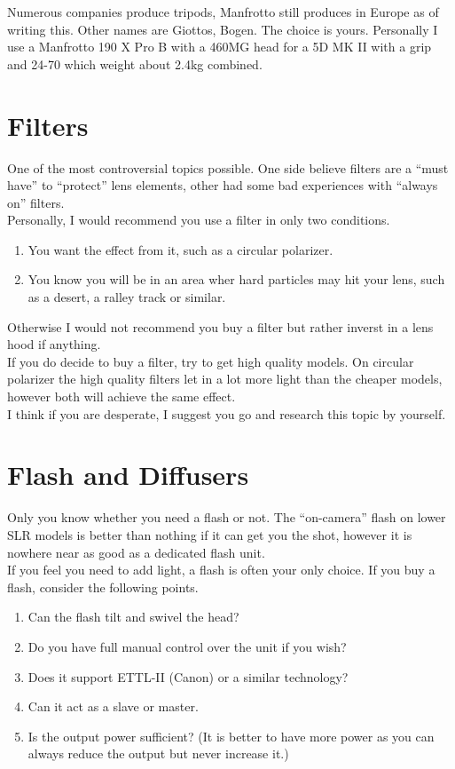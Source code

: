 Numerous companies produce tripods, Manfrotto still produces in Europe as of writing this.
Other names are Giottos, Bogen. The choice is yours. Personally I use a Manfrotto 190 X Pro B with a 460MG head for a 5D MK II with a grip and 24-70 which weight about 2.4kg combined.

\section{Filters}

One of the most controversial topics possible. One side believe filters are a ``must have'' to ``protect'' lens elements, other had some bad experiences with ``always on'' filters.
\\
Personally, I would recommend you use a filter in only two conditions.
\begin{enumerate}
	\item You want the effect from it, such as a circular polarizer.
	\item You know you will be in an area wher hard particles may hit your lens, such as a desert, a ralley track or similar.
\end{enumerate}

Otherwise I would not recommend you buy a filter but rather inverst in a lens hood if anything.
\\
If you do decide to buy a filter, try to get high quality models. On circular polarizer the high quality filters let in a lot more light than the cheaper models, however both will achieve the same effect.
\\
I think if you are desperate, I suggest you go and research this topic by yourself.


\section{Flash and Diffusers}

Only you know whether you need a flash or not. The ``on-camera'' flash on lower SLR models is better than nothing if it can get you the shot, however it is nowhere near as good as a dedicated flash unit.
\\
If you feel you need to add light, a flash is often your only choice. If you buy a flash, consider the following points.

\begin{enumerate}
	\item Can the flash tilt and swivel the head?
	\item Do you have full manual control over the unit if you wish?
	\item Does it support ETTL-II (Canon) or a similar technology?
	\item Can it act as a slave or master.
	\item Is the output power sufficient? (It is better to have more power as you can always reduce the output but never increase it.)
\end{enumerate}


